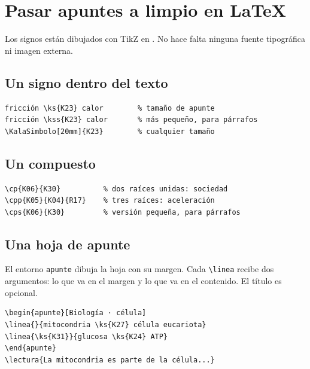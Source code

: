 \section{Pasar apuntes a limpio en LaTeX}\label{sec:latex}

Los signos están dibujados con TikZ en . No hace falta
ninguna fuente tipográfica ni imagen externa.

\subsection{Un signo dentro del texto}
\begin{Verbatim}[fontsize=\small,frame=single]
fricción \ks{K23} calor        % tamaño de apunte
fricción \kss{K23} calor       % más pequeño, para párrafos
\KalaSimbolo[20mm]{K23}        % cualquier tamaño
\end{Verbatim}

\subsection{Un compuesto}
\begin{Verbatim}[fontsize=\small,frame=single]
\cp{K06}{K30}          % dos raíces unidas: sociedad
\cpp{K05}{K04}{R17}    % tres raíces: aceleración
\cps{K06}{K30}         % versión pequeña, para párrafos
\end{Verbatim}

\subsection{Una hoja de apunte}
El entorno \texttt{apunte} dibuja la hoja con su margen. Cada \verb|\linea| recibe
dos argumentos: lo que va en el margen y lo que va en el contenido. El título
es opcional.
\begin{Verbatim}[fontsize=\small,frame=single]
\begin{apunte}[Biología · célula]
\linea{}{mitocondria \ks{K27} célula eucariota}
\linea{\ks{K31}}{glucosa \ks{K24} ATP}
\end{apunte}
\lectura{La mitocondria es parte de la célula...}
\end{Verbatim}
\begin{apunte}
\end{apunte}


